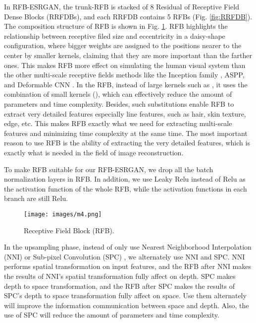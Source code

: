 \documentclass[10pt,twocolumn,letterpaper]{article}
\begin{document}
In RFB-ESRGAN, the trunk-RFB is stacked of 8 Residual of Receptive Field Dense Blocks (RRFDBs), and each RRFDB contains 5 RFBs (Fig. \ref{fig:RRFDB}). The composition structure of RFB is shown in Fig. \ref{fig:RFB}. RFB highlights the relationship between receptive filed size and eccentricity in a daisy-shape configuration, where bigger weights are assigned to the positions nearer to the center by smaller kernels, claiming that they are more important than the farther ones. This makes RFB more effect on simulating the human visual system than the other multi-scale receptive fields methods like the Inception family \cite{szegedy2015going}, ASPP\cite{chen2017rethinking}, and Deformable CNN \cite{dai2017deformable}. In the RFB, instead of large kernels such as , it uses the combination of small kernels (), which can effectively reduce the amount of parameters and time complexity. Besides, such substitutions enable RFB to extract very detailed features especially line features, such as hair, skin texture, edge, etc. This makes RFB exactly what we need for extracting multi-scale features and minimizing time complexity at the same time. The most important reason to use RFB is the ability of extracting the very detailed features, which is exactly what is needed in the field of image reconstruction.

To make RFB suitable for our RFB-ESRGAN, we drop all the batch normalization layers in RFB. In addition, we use Leaky Relu instead of Relu as the activation function of the whole RFB, while the activation functions in each branch are still Relu.




\begin{figure}[htbp]
\centering 
\texttt{[image: images/m4.png]}
\caption{Receptive Field Block (RFB).}
\label{fig:RFB}
\end{figure}


In the upsampling phase, instead of only use Nearest Neighborhood Interpolation (NNI) or Sub-pixel Convolution (SPC) \cite{shi2016real}, we alternately use NNI and SPC. NNI performs spatial transformation on input features, and the RFB after NNI makes the results of NNI's spatial transformation fully affect on depth. SPC makes depth to space transformation, and the RFB after SPC makes the results of SPC's depth to space transformation fully affect on space. Use them alternately will improve the information communication between space and depth. Also, the use of SPC will reduce the amount of parameters and time complexity.
\end{document}
